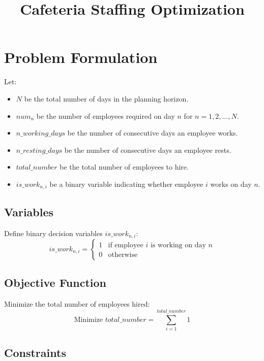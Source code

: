 \documentclass{article}
\begin{document}
\title{Cafeteria Staffing Optimization}
\author{}
\date{}
\maketitle

\section*{Problem Formulation}

Let:
\begin{itemize}
    \item \( N \) be the total number of days in the planning horizon.
    \item \( num_n \) be the number of employees required on day \( n \) for \( n = 1, 2, \ldots, N \).
    \item \( n\_working\_days \) be the number of consecutive days an employee works.
    \item \( n\_resting\_days \) be the number of consecutive days an employee rests.
    \item \( total\_number \) be the total number of employees to hire.
    \item \( is\_work_{n,i} \) be a binary variable indicating whether employee \( i \) works on day \( n \).
\end{itemize}

\subsection*{Variables}

Define binary decision variables \( is\_work_{n,i} \):
\[
is\_work_{n,i} =
\begin{cases}
1 & \text{if employee } i \text{ is working on day } n \\
0 & \text{otherwise}
\end{cases}
\]

\subsection*{Objective Function}

Minimize the total number of employees hired:
\[
\text{Minimize } total\_number = \sum_{i=1}^{total\_number} 1
\]

\subsection*{Constraints}
\end{document}
